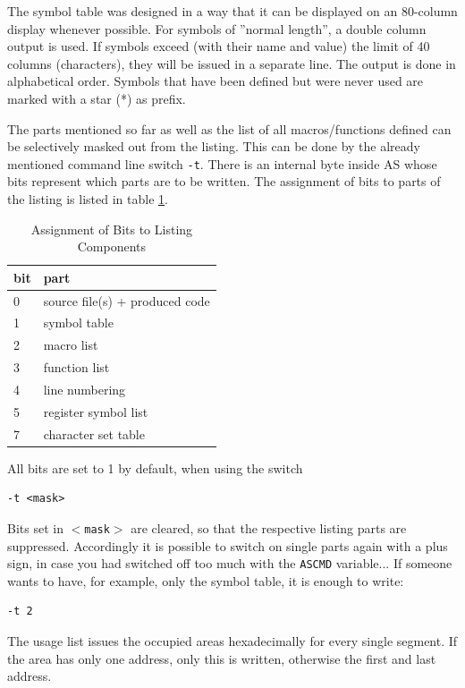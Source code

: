 \documentclass[12pt,twoside]{report}
\newcommand{\tty}[1]{{\tt #1}}
\newcommand{\asname}{{AS}}
\begin{document}
The symbol table was designed in a way that it can be displayed on an
80-column display whenever possible. For symbols of ''normal length'',
a double column output is used.  If symbols exceed (with their name
and value) the limit of 40 columns (characters), they will be issued
in a separate line. The output is done in alphabetical order.
Symbols that have been defined but were never used are marked with a
star (*) as prefix.

The parts mentioned so far as well as the list of all macros/functions
defined can be selectively masked out from the listing.
This can be done by the already mentioned command line switch \tty{-t}.
There is an internal byte inside \asname{} whose bits represent which parts
are to be written.  The assignment of bits to parts of the listing is
listed in table \ref{TabTBits}.
\par
\begin{table}[htb]
\begin{center}\begin{tabular}{|l|l|}
\hline
bit &  part \\
\hline
\hline
0   & source file(s) + produced code \\
1   & symbol table \\
2   & macro list \\
3   & function list \\
4   & line numbering \\
5   & register symbol list \\
7   & character set table \\
\hline
\end{tabular}\end{center}
\caption{Assignment of Bits to Listing Components\label{TabTBits}}
\end{table}
All bits are set to 1 by default, when using the switch
\begin{verbatim}
-t <mask>
\end{verbatim}
Bits set in \tty{$<$mask$>$} are cleared, so that the respective listing
parts are suppressed.  Accordingly it is possible to switch on single
parts again with a plus sign, in case you had switched off too much
with the \tty{ASCMD} variable... If someone wants to have, for example,
only the symbol table, it is enough to write:
\begin{verbatim}
-t 2
\end{verbatim}
The usage list issues the occupied areas hexadecimally for every
single segment.  If the area has only one address, only this is written,
otherwise the first and last address.
\end{document}
